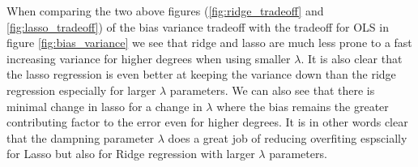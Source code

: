\documentclass[12pt]{article}
\begin{document}
When comparing the two above figures (\ref{fig:ridge_tradeoff} and \ref{fig:lasso_tradeoff}) of the bias variance tradeoff with the tradeoff for OLS in figure \ref{fig:bias_variance} we see that ridge and lasso are much less prone to a fast increasing variance for higher degrees when using smaller $\lambda$. It is also clear that the lasso regression is even better at keeping the variance down than the ridge regression especially for larger $\lambda$ parameters. We can also see that there is minimal change in lasso for a change in $\lambda$ where the bias remains the greater contributing factor to the error even for higher degrees. It is in other words clear that the dampning parameter $\lambda$ does a great job of reducing overfiting espscially for Lasso but also for Ridge regression with larger $\lambda$ parameters.
\end{document}
